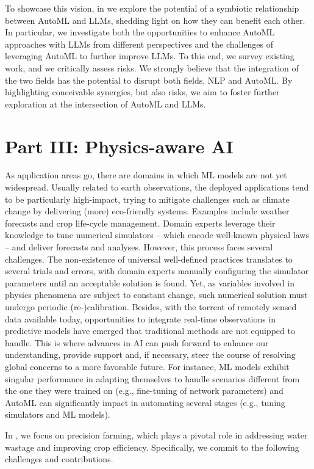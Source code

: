 To showcase this vision, in  we explore the potential of a symbiotic relationship between AutoML and LLMs, shedding light on how they can benefit each other.
In particular, we investigate both the opportunities to enhance AutoML approaches with LLMs from different perspectives and the challenges of leveraging AutoML to further improve LLMs.
To this end, we survey existing work, and we critically assess risks.
We strongly believe that the integration of the two fields has the potential to disrupt both fields, NLP and AutoML.
By highlighting conceivable synergies, but also risks, we aim to foster further exploration at the intersection of AutoML and LLMs.

\section*{Part III: Physics-aware AI}

As application areas go, there are domains in which ML models are not yet widespread.
Usually related to earth observations, the deployed applications tend to be particularly high-impact, trying to mitigate challenges such as climate change by delivering (more) eco-friendly systems.
Examples include weather forecasts and crop life-cycle management.
Domain experts leverage their knowledge to tune numerical simulators -- which encode well-known physical laws -- and deliver forecasts and analyses.
However, this process faces several challenges.
The non-existence of universal well-defined practices translates to several trials and errors, with domain experts manually configuring the simulator parameters until an acceptable solution is found.
Yet, as variables involved in physics phenomena are subject to constant change, such numerical solution must undergo periodic (re-)calibration.
Besides, with the torrent of remotely sensed data available today, opportunities to integrate real-time observations in predictive models have emerged that traditional methods are not equipped to handle.
This is where advances in AI can push forward to enhance our understanding, provide support and, if necessary, steer the course of resolving global concerns to a more favorable future.
For instance, ML models exhibit singular performance in adapting themselves to handle scenarios different from the one they were trained on (e.g., fine-tuning of network parameters) and AutoML can significantly impact in automating several stages (e.g., tuning simulators and ML models).

In , we focus on precision farming, which plays a pivotal role in addressing water wastage and improving crop efficiency. Specifically, we commit to the following challenges and contributions.


